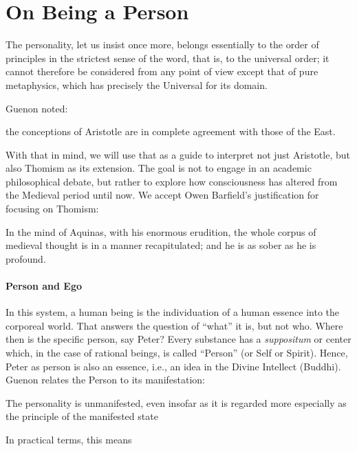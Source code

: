 \section{On Being a Person}

\begin{quotex}
The personality, let us insist once more, belongs essentially to the order of principles in the strictest sense of the word, that is, to the universal order; it cannot therefore be considered from any point of view except that of pure metaphysics, which has precisely the Universal for its domain. 

\end{quotex}
Guenon noted:

\begin{quotex}
the conceptions of Aristotle are in complete agreement with those of the East.

\end{quotex}
With that in mind, we will use that as a guide to interpret not just Aristotle, but also Thomism as its extension. The goal is not to engage in an academic philosophical debate, but rather to explore how consciousness has altered from the Medieval period until now. We accept Owen Barfield's justification for focusing on Thomism:

\begin{quotex}
In the mind of Aquinas, with his enormous erudition, the whole corpus of medieval thought is in a manner recapitulated; and he is as sober as he is profound.

\end{quotex}
\paragraph{Person and Ego}
In this system, a human being is the individuation of a human essence into the corporeal world. That answers the question of “what” it is, but not who. Where then is the specific person, say Peter? Every substance has a \emph{suppositum} or center which, in the case of rational beings, is called “Person” (or Self or Spirit). Hence, Peter as person is also an essence, i.e., an idea in the Divine Intellect (Buddhi). Guenon relates the Person to its manifestation:

\begin{quotex}
The personality is unmanifested, even insofar as it is regarded more especially as the principle of the manifested state

\end{quotex}
In practical terms, this means

